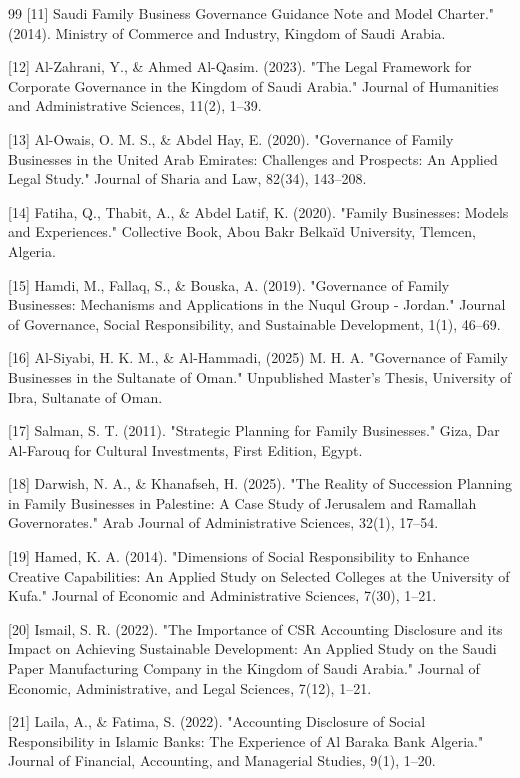 \documentclass{default}
\begin{document}
\begin{thebibliography}{99}
[11] Saudi Family Business Governance Guidance Note and Model Charter." (2014). Ministry of Commerce and Industry, Kingdom of Saudi Arabia.

[12] Al-Zahrani, Y., \& Ahmed Al-Qasim. (2023). "The Legal Framework for Corporate Governance in the Kingdom of Saudi Arabia." Journal of Humanities and Administrative Sciences, 11(2), 1–39.

[13] Al-Owais, O. M. S., \& Abdel Hay, E. (2020). "Governance of Family Businesses in the United Arab Emirates: Challenges and Prospects: An Applied Legal Study." Journal of Sharia and Law, 82(34), 143–208.

[14] Fatiha, Q., Thabit, A., \& Abdel Latif, K. (2020). "Family Businesses: Models and Experiences." Collective Book, Abou Bakr Belkaïd University, Tlemcen, Algeria.

[15] Hamdi, M., Fallaq, S., \& Bouska, A. (2019). "Governance of Family Businesses: Mechanisms and Applications in the Nuqul Group - Jordan." Journal of Governance, Social Responsibility, and Sustainable Development, 1(1), 46–69.

[16] Al-Siyabi, H. K. M., \& Al-Hammadi, (2025) M. H. A. "Governance of Family Businesses in the Sultanate of Oman." Unpublished Master's Thesis, University of Ibra, Sultanate of Oman.

[17] Salman, S. T. (2011). "Strategic Planning for Family Businesses." Giza, Dar Al-Farouq for Cultural Investments, First Edition, Egypt.

[18] Darwish, N. A., \& Khanafseh, H. (2025). "The Reality of Succession Planning in Family Businesses in Palestine: A Case Study of Jerusalem and Ramallah Governorates." Arab Journal of Administrative Sciences, 32(1), 17–54.

[19] Hamed, K. A. (2014). "Dimensions of Social Responsibility to Enhance Creative Capabilities: An Applied Study on Selected Colleges at the University of Kufa." Journal of Economic and Administrative Sciences, 7(30), 1–21.

[20] Ismail, S. R. (2022). "The Importance of CSR Accounting Disclosure and its Impact on Achieving Sustainable Development: An Applied Study on the Saudi Paper Manufacturing Company in the Kingdom of Saudi Arabia." Journal of Economic, Administrative, and Legal Sciences, 7(12), 1–21.

[21] Laila, A., \& Fatima, S. (2022). "Accounting Disclosure of Social Responsibility in Islamic Banks: The Experience of Al Baraka Bank Algeria." Journal of Financial, Accounting, and Managerial Studies, 9(1), 1–20.


\end{thebibliography}
\end{document}
